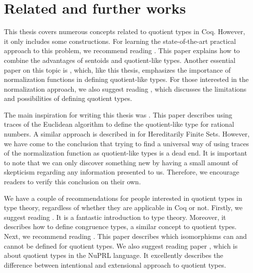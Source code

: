 \section{Related and further works}
This thesis covers numerous concepts related to quotient types in Coq. However, it only includes some constructions. For learning the state-of-the-art practical approach to this problem, we recommend reading \cite{PragmaticQT}. This paper explains how to combine the advantages of sentoids and quotient-like types. Another essential paper on this topic is \cite{NormalizedTypes}, which, like this thesis, emphasizes the importance of normalization functions in defining quotient-like types. For those interested in the normalization approach, we also suggest reading \cite{DefinableQuotients}, which discusses the limitations and possibilities of defining quotient types.

The main inspiration for writing this thesis was \cite{Qplus}. This paper describes using traces of the Euclidean algorithm to define the quotient-like type for rational numbers. A similar approach is described in \cite{HereditarilyFS} for Hereditarily Finite Sets. However, we have come to the conclusion that trying to find a universal way of using traces of the normalization function as quotient-like types is a dead end. It is important to note that we can only discover something new by having a small amount of skepticism regarding any information presented to us. Therefore, we encourage readers to verify this conclusion on their own.

We have a couple of recommendations for people interested in quotient types in type theory, regardless of whether they are applicable in Coq or not. Firstly, we suggest reading \cite{DIY_TT}. It is a fantastic introduction to type theory. Moreover, it describes how to define congruence types, a similar concept to quotient types. Next, we recommend reading \cite{Quot_izo}. This paper describes which isomorphisms can and cannot be defined for quotient types. We also suggest reading paper \cite{NuPRL_quot}, which is about quotient types in the NuPRL language. It excellently describes the difference between intentional and extensional approach to quotient types.

